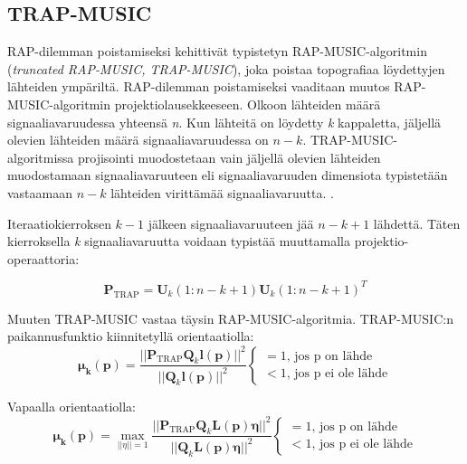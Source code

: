 \subsection{TRAP-MUSIC}
RAP-dilemman poistamiseksi \cite{Makela2018TruncatedLocalization} kehittivät typistetyn RAP-MUSIC-algoritmin (\textit{truncated RAP-MUSIC, TRAP-MUSIC}), joka poistaa topografiaa löydettyjen lähteiden ympäriltä. RAP-dilemman poistamiseksi vaaditaan muutos RAP-MUSIC-algoritmin projektiolausekkeeseen. 
Olkoon lähteiden määrä signaaliavaruudessa yhteensä \textit{n}. Kun lähteitä on löydetty \textit{k} kappaletta, jäljellä olevien lähteiden määrä signaaliavaruudessa on $n-k$. TRAP-MUSIC-algoritmissa projisointi muodostetaan vain jäljellä olevien lähteiden muodostamaan signaaliavaruuteen eli signaaliavaruuden dimensiota typistetään vastaamaan $n-k$ lähteiden virittämää signaaliavaruutta. \citep{Makela2018TruncatedLocalization}.

Iteraatiokierroksen $k-1$ jälkeen signaaliavaruuteen jää $n-k+1$ lähdettä. Täten kierroksella \textit{k} signaaliavaruutta voidaan typistää muuttamalla projektio-operaattoria:

\begin{equation}
    \mathbf{P}_{\text{TRAP}} = \mathbf{U}_k(1:n-k+1)\mathbf{U}_k(1:n-k+1)^T
\end{equation}

Muuten TRAP-MUSIC vastaa täysin RAP-MUSIC-algoritmia. TRAP-MUSIC:n paikannusfunktio kiinnitetyllä orientaatiolla:
\begin{equation}
    \mathbf{\mu_k(p)} = \frac{||\mathbf{P}_{\text{TRAP}}\mathbf{Q}_k\mathbf{l(p)}||^2}{||\mathbf{Q}_k\mathbf{l(p)}||^2}
    \begin{cases}
    =1\text{, jos p on lähde}\\
    <1\text{, jos p ei ole lähde}
     \end{cases}
     \label{eq:TRAPfix}
\end{equation}

Vapaalla orientaatiolla:
\begin{equation}
    \mathbf{\mu_k(p)} = \max_{||\eta||=1} \frac{||\mathbf{P}_{\text{TRAP}}\mathbf{Q}_k\mathbf{L(p)\eta}||^2}{||\mathbf{Q}_k\mathbf{L(p)\eta}||^2}
    \begin{cases}
    =1\text{, jos p on lähde}\\
    <1\text{, jos p ei ole lähde}
     \end{cases}
     \label{eq:TRAPfree}
\end{equation}